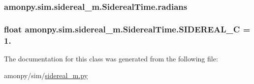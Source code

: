 \hypertarget{classamonpy_1_1sim_1_1sidereal__m_1_1_sidereal_time_a7c0b958d0efa0333b2fc200246d54208}{
\subsubsection[{radians}]{\setlength{\rightskip}{0pt plus 5cm}amonpy.\-sim.\-sidereal\-\_\-m.\-Sidereal\-Time.\-radians}}\label{classamonpy_1_1sim_1_1sidereal__m_1_1_sidereal_time_a7c0b958d0efa0333b2fc200246d54208}
\hypertarget{classamonpy_1_1sim_1_1sidereal__m_1_1_sidereal_time_abafb90031c8e41f1a81ea51ce210e13b}{
\subsubsection[{S\-I\-D\-E\-R\-E\-A\-L\-\_\-\-C}]{\setlength{\rightskip}{0pt plus 5cm}float amonpy.\-sim.\-sidereal\-\_\-m.\-Sidereal\-Time.\-S\-I\-D\-E\-R\-E\-A\-L\-\_\-\-C = 1.\hspace{0.3cm}{\ttfamily [static]}}}\label{classamonpy_1_1sim_1_1sidereal__m_1_1_sidereal_time_abafb90031c8e41f1a81ea51ce210e13b}


The documentation for this class was generated from the following file\-:\begin{DoxyCompactItemize}
\item 
amonpy/sim/\hyperlink{sidereal__m_8py}{sidereal\-\_\-m.\-py}\end{DoxyCompactItemize}
